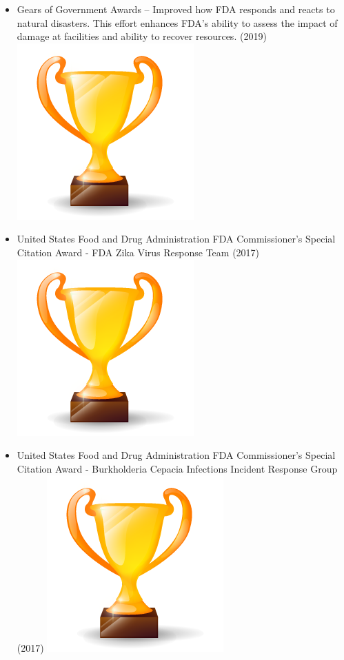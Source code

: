 \documentclass[letterpaper]{twentysecondcv} %
\begin{document}
{{\begin{itemize}
\item	Gears of Government Awards – Improved how FDA responds and reacts to natural disasters. This effort enhances FDA’s ability to assess the impact of damage at facilities and ability to recover resources.  (2019)	\includegraphics[scale=0.05]{img/trophy.png}
\item	United States Food and Drug Administration FDA Commissioner's Special Citation Award - FDA Zika Virus Response Team (2017)	\includegraphics[scale=0.05]{img/trophy.png}
\item	United States Food and Drug Administration FDA Commissioner's Special Citation Award - Burkholderia Cepacia Infections Incident Response Group (2017)	\includegraphics[scale=0.05]{img/trophy.png}

\end{itemize}}}
\end{document}
